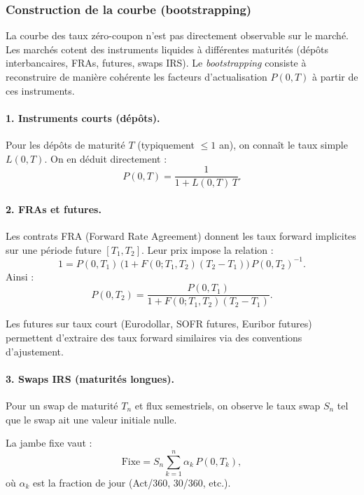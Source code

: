 \documentclass[11pt,a4paper]{article}
\newcommand{\1}{\mathbf{1}}
\begin{document}
\subsubsection{Construction de la courbe (bootstrapping)}

La courbe des taux z\'ero-coupon n'est pas directement observable sur le march\'e.
Les march\'es cotent des instruments liquides \`a diff\'erentes maturit\'es
(dépôts interbancaires, FRAs, futures, swaps IRS).
Le \emph{bootstrapping} consiste \`a reconstruire de mani\`ere cohérente les
facteurs d'actualisation $P(0,T)$ à partir de ces instruments.

\paragraph{1. Instruments courts (dép\^ots).}

Pour les d\'ep\^ots de maturit\'e $T$ (typiquement $\leq 1$ an), on conna\^it le
taux simple $L(0,T)$.
On en d\'eduit directement :
\[
P(0,T) = \frac{1}{1 + L(0,T)\,T}.
\]

\paragraph{2. FRAs et futures.}

Les contrats FRA (Forward Rate Agreement) donnent les taux forward implicites
sur une p\'eriode future $[T_1,T_2]$.
Leur prix impose la relation :
\[
1 = P(0,T_1)\,\bigl(1 + F(0;T_1,T_2)(T_2-T_1)\bigr)\, P(0,T_2)^{-1}.
\]
Ainsi :
\[
P(0,T_2)
=
\frac{P(0,T_1)}{1 + F(0;T_1,T_2)(T_2-T_1)}.
\]

Les futures sur taux court (Eurodollar, SOFR futures, Euribor futures) permettent
d'extraire des taux forward similaires via des conventions d'ajustement.

\paragraph{3. Swaps IRS (maturit\'es longues).}

Pour un swap de maturit\'e $T_n$ et flux semestriels, on observe le taux swap $S_n$
tel que le swap ait une valeur initiale nulle.

La jambe fixe vaut :
\[
\text{Fixe}
= S_n \sum_{k=1}^{n} \alpha_k\, P(0,T_k),
\]
où $\alpha_k$ est la fraction de jour (Act/360, 30/360, etc.).
\end{document}
